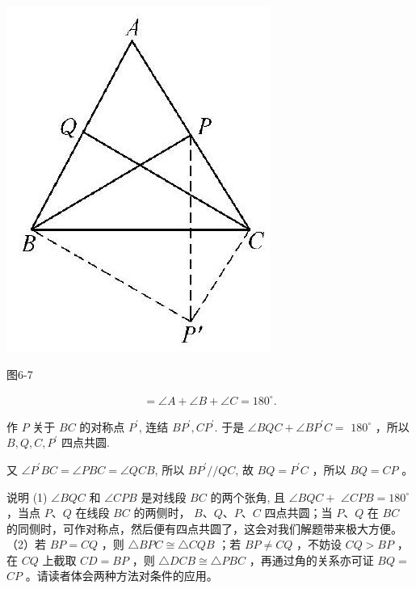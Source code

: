 \documentclass[10pt]{article}
\begin{document}
\begin{center}
\includegraphics[max width=\textwidth]{2024_10_30_66b8e5e701da2093c133g-046(2)}
\end{center}

图6-7

\begin{align*}
=\angle A+\angle B+\angle C=180^{\circ} .
\end{align*}

作 $P$ 关于 $B C$ 的对称点 $P^{\prime}$, 连结 $B P^{\prime}, C P^{\prime}$. 于是 $\angle B Q C+\angle B P^{\prime} C=$ $180^{\circ}$ ，所以 $B, Q, C, P^{\prime}$ 四点共圆.

又 $\angle P^{\prime} B C=\angle P B C=\angle Q C B$, 所以 $B P^{\prime} / / Q C$, 故 $B Q=P^{\prime} C$ ，所以 $B Q=C P$ 。

说明 (1) $\angle B Q C$ 和 $\angle C P B$ 是对线段 $B C$ 的两个张角, 且 $\angle B Q C+$ $\angle C P B=180^{\circ}$ ，当点 $P 、 Q$ 在线段 $B C$ 的两侧时， $B 、 Q 、 P 、 C$ 四点共圆；当 $P 、 Q$ 在 $B C$ 的同侧时，可作对称点，然后便有四点共圆了，这会对我们解题带来极大方便。\\
（2）若 $B P=C Q$ ，则 $\triangle B P C \cong \triangle C Q B$ ；若 $B P \neq C Q$ ，不妨设 $C Q>B P$ ，在 $C Q$ 上截取 $C D=B P$ ，则 $\triangle D C B \cong \triangle P B C$ ，再通过角的关系亦可证 $B Q=$ $C P$ 。请读者体会两种方法对条件的应用。
\end{document}
